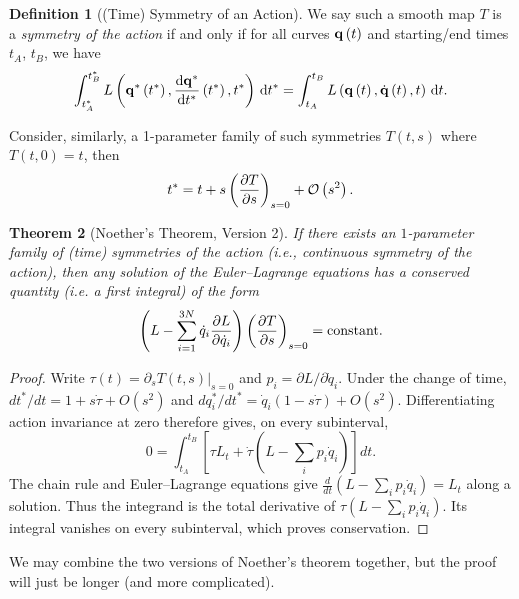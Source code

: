 \documentclass[11pt]{article}
\numberwithin{equation}{section}
\newtheorem{theorem}{Theorem}[section]
\theoremstyle{definition}
\newtheorem{definition}[theorem]{Definition}
\theoremstyle{remark}
\newcommand{\pqty}[1]{\left(#1\right)}
\newcommand{\bigO}{\mathcal{O}}
\begin{document}
\begin{definition}[(Time) Symmetry of an Action]\label{variation-unit-0082}
    We say such a smooth map \(T\) is a \emph{symmetry of the action} if and only if for all curves \(\vb{q} \pqty{t}\) and starting/end times \(t_A\), \(t_B\), we have
    \begin{equation}
        \label{eq:symmetry-of-action-time}%
        \int_{t_A^{\ast}}^{t_B^{\ast}} L\pqty{\vb{q}^{\ast} \pqty{t^{\ast}}, \dv{\vb{q}^{\ast}}{t^\ast} \pqty{t^{\ast}}, t^{\ast}} \dd{t^{\ast}} = \int_{t_A}^{t_B} L \pqty{\vb{q} \pqty{t}, \dot{\vb{q}} \pqty{t}, t} \dd{t}.
    \end{equation}
\end{definition}

Consider, similarly, a 1-parameter family of such symmetries \(T\pqty{t, s}\) where \(T\pqty{t, 0} = t\), then
\[
    t^{\ast} = t + s \pqty{\pdv{T}{s}}_{s = 0} + \bigO\pqty{s^2}.
\]

\begin{theorem}[Noether's Theorem, Version 2]\label{variation-unit-0083}
    \label{thm:noether-thm-ver-2}%
    If there exists an \(1\)-parameter family of (time) symmetries of the action (i.e., continuous symmetry of the action), then any solution of the Euler--Lagrange equations has a conserved quantity (i.e. a first integral) of the form
    \[
        \pqty{L - \sum_{i = 1}^{3N} \dot{q}_i \pdv{L}{\dot{q}_i}} \pqty{\pdv{T}{s}}_{s = 0} = \text{constant}.
    \]
\end{theorem}

\begin{proof}
Write \(\tau(t)=\left.\partial_sT(t,s)\right|_{s=0}\) and
\(p_i=\partial L/\partial\dot q_i\). Under the change of time,
\(dt^*/dt=1+s\dot\tau+O(s^2)\) and
\(dq_i^*/dt^*=\dot q_i(1-s\dot\tau)+O(s^2)\).
Differentiating action invariance at zero therefore gives, on every subinterval,
\[
0=\int_{t_A}^{t_B}\left[\tau L_t+
\dot\tau\left(L-\sum_i p_i\dot q_i\right)\right]dt.
\]
The chain rule and Euler--Lagrange equations give
\(\frac{d}{dt}(L-\sum_i p_i\dot q_i)=L_t\) along a solution.
Thus the integrand is the total derivative of
\(\tau(L-\sum_i p_i\dot q_i)\). Its integral vanishes on every subinterval,
which proves conservation.
\end{proof}

We may combine the two versions of Noether's theorem together, but the proof will just be longer (and more complicated).
\end{document}
